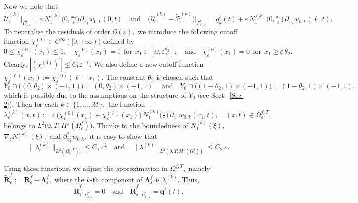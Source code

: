 \documentclass[reqno]{amsart}            %
\numberwithin{equation}{section}
\begin{document}
	Now we note that 
	\begin{equation*}
		\widetilde{\mathcal{U}}^{(k)}_\varepsilon\Big|_{\Gamma^T_{0,\varepsilon}} = \varepsilon\, N^{(k)}_1\big(0,\tfrac{x_2}{\varepsilon}\big) \, \partial_{x_1}w_{0,k}(0,t) \quad \text{and} \quad  \Big(\widetilde{\mathcal{U}}^{(k)}_\varepsilon + \widetilde{\mathcal{P}}^{(k)}_\varepsilon \Big)\Big|_{\Gamma^T_{\ell,\varepsilon}} = q^\ell_k(t) + \varepsilon\, N^{(k)}_1\big(0,\tfrac{x_2}{\varepsilon}\big) \, \partial_{x_1}w_{0,k}(\ell,t).
	\end{equation*}
	To neutralize the residuals of order $\mathcal{O}(\varepsilon),$ we introduce the following  cutoff function $\chi_\varepsilon^{(0)} \in C^\infty([0,+\infty))$ defined by
	$$
	0\le \chi_\varepsilon^{(0)}(x_1) \le 1, \quad \chi_\varepsilon^{(0)}(x_1) = 1 \ \ \text{for} \ \ x_1\in [0, \varepsilon  \tfrac{\theta_2}{2}], \quad \text{and}  \quad \chi_\varepsilon^{(0)}(x_1) = 0 \ \ \text{for} \ \ x_1 \ge \varepsilon \, \theta_2 .
	$$
	Clearly, $|(\chi_\varepsilon^{(0)})^\prime| \le C_0 \varepsilon^{-1}.$ We also define a new cutoff function $\chi_\varepsilon^{(\ell)}(x_1) := \chi_\varepsilon^{(0)}(\ell - x_1).$ The constant $\theta_2$ is chosen such that 
	$$
	Y_0 \cap \big((0, \theta_2) \times (-1, 1)\big) = (0, \theta_2) \times (-1, 1)\quad \text{ and} \quad Y_0 \cap \big((1- \theta_2, 1) \times (-1, 1)\big) = (1- \theta_2, 1) \times (-1, 1),
	$$ 
	which is possible due to the assumptions on the structure of $Y_0$ (see Sect.~\ref{Sec-2}). 
	Then for each $k\in \{1,\ldots,\mathcal{M}\},$ the function
	\begin{equation}\label{function-L}
		\lambda_\varepsilon^{(k)}(x,t) := \varepsilon \,\big(\chi_\varepsilon^{(0)}(x_1) + \chi_\varepsilon^{(\ell)}(x_1)\big)\, N^{(k)}_1\big(\tfrac{x}{\varepsilon}\big) \, \partial_{x_1}w_{0,k}(x_1,t), \quad (x,t) \in \Omega_\varepsilon^{f, T},
	\end{equation}
	belongs to $L^2\big(0,T; H^1(\Omega_\varepsilon^f)\big).$ Thanks to the boundedness of $N^{(k)}_1(\xi),$  $\nabla_{\xi}N^{(k)}_1(\xi),$
	and $\partial^2_{x^2_1}w_{0,k},$ it is easy to show that
	\begin{equation}\label{function-L-bound}
		\|\lambda_\varepsilon^{(k)}\|_{L^2(\Omega_\varepsilon^{f, T}))} \le C_1 \, \varepsilon^2 \quad \text{and} \quad 
		\|\lambda_\varepsilon^{(k)}\|_{L^2(0,T; H^1(\Omega_\varepsilon^f))} \le C_2 \, \varepsilon .
	\end{equation}
	
	Using these functions, we adjust the approximation in $\Omega^{f,T}_\varepsilon,$ namely $\widetilde{\mathbf{R}}_\varepsilon^f :=  \mathbf{R}_\varepsilon^f - \mathbf{\Lambda}^f_\varepsilon,$ where the $k$-th component of $\mathbf{\Lambda}^f_\varepsilon$ is  
	$\lambda_\varepsilon^{(k)}.$ Thus, 
	\begin{equation}
		\widetilde{\mathbf{R}}_\varepsilon^f\Big|_{\Gamma^T_{0,\varepsilon}} = 0 \quad \text{and} \quad                                 \widetilde{\mathbf{R}}_\varepsilon^f\Big|_{\Gamma^T_{\ell,\varepsilon}} = \mathbf{q}^\ell(t).	
	\end{equation}
	
\end{document}
